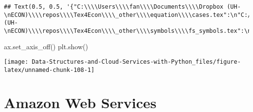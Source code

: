 \documentclass[
]{book}
\newenvironment{Shaded}{\begin{snugshade}}{\end{snugshade}}
\newcommand{\NormalTok}[1]{#1}
\begin{document}
\begin{verbatim}
## Text(0.5, 0.5, '{"C:\\\\Users\\\\fan\\\\Documents\\\\Dropbox (UH-\nECON)\\\\repos\\\\Tex4Econ\\\\_other\\\\equation\\\\cases.tex":\n"C:/Users/fan/Documents/cases.pdf",\n"C:\\\\Users\\\\fan\\\\Documents\\\\Dropbox (UH-\nECON)\\\\repos\\\\Tex4Econ\\\\_other\\\\symbols\\\\fs_symbols.tex":\n"C:/Users/fan/Documents/fs_symbols.pdf"}')
\end{verbatim}

\begin{Shaded}
\begin{Highlighting}[]
\NormalTok{ax.set\_axis\_off()}
\NormalTok{plt.show()}
\end{Highlighting}
\end{Shaded}

\begin{center}\texttt{[image: Data-Structures-and-Cloud-Services-with-Python\_files/figure-latex/unnamed-chunk-108-1]} \end{center}

\hypertarget{amazon-web-services}{%
\chapter{Amazon Web Services}\label{amazon-web-services}}
\end{document}
